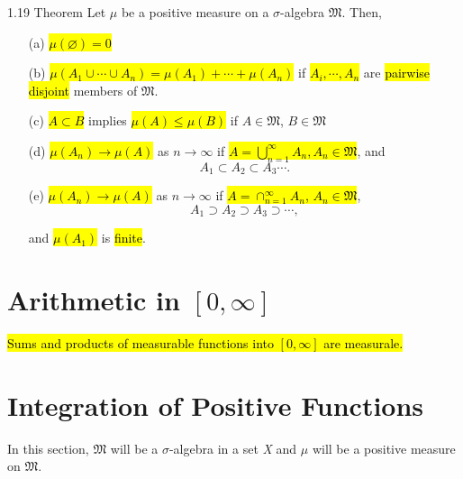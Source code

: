 \documentclass{article}
\begin{document}
\begin{theo}{1.19 Theorem}
	Let $\mu$ be a positive measure on a $\sigma$-algebra $\mathfrak{M}$. Then,
	\begin{enumerate}
  \item [(a)]
  \hl{$\mu(\varnothing)=0$}
  \item [(b)]
  \hl{$\mu(A_1\cup \cdots\cup A_n)=\mu(A_1)+\cdots+\mu(A_n)$} if \hl{$A_i,\cdots,A_n$} are \hl{pairwise disjoint} members of $\mathfrak{M}$.
  \item [(c)] 
  \hl{$A\subset B$} implies \hl{$\mu(A)\le\mu(B)$} if $A\in\mathfrak{M}$, $B\in\mathfrak{M}$
  \item [(d)]\hl{$\mu(A_n)\rightarrow\mu(A)$} as $n\rightarrow\infty$ if \hl{$A=\bigcup_{n=1}^\infty A_n, A_n\in\mathfrak{M}$}, and
  \begin{displaymath}
  A_1\subset A_2\subset A_3\cdots.
\end{displaymath}
  \item [(e)] \hl{$\mu(A_n)\rightarrow\mu(A)$} as $n\rightarrow\infty$ if \hl{$A=\cap^\infty_{n=1}A_n$, $A_n\in\mathfrak{M}$},
  \begin{displaymath}
  A_1\supset A_2\supset A_3\supset\cdots,
\end{displaymath}

and \hl{$\mu(A_1)$} is \hl{finite}.

\end{enumerate}

\end{theo}

\section*{Arithmetic in $[0,\infty]$}

\hl{Sums and products of measurable functions into $[0,\infty]$ are measurale.}

\section*{Integration of Positive Functions}

In this section, $\mathfrak{M}$ will be a $\sigma$-algebra in a set \textit{X} and $\mu$ will be a positive measure on $\mathfrak{M}$.
\end{document}
